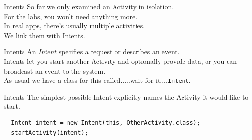 \documentclass[aspectratio=169]{beamer}
\begin{document}
\begin{frame}{Intents}
\Large
So far we only examined an Activity in isolation. \\
\vspace{1em}
For the labs, you won't need anything more. \\
\vspace{1em}
In real apps, there's usually multiple activities. \\
\vspace{1em}
We link them with Intents.
\end{frame}



\begin{frame}{Intents}
\Large
An \emph{Intent} specifies a request or describes an event. \\
\vspace{1em}
Intents let you start another Activity and optionally provide data, or you can broadcast an event to the system. \\
\vspace{1em}
As usual we have a class for this called.....wait for it....\pause\texttt{Intent}.
\end{frame}



\begin{frame}[fragile]{Intents}
\Large
The simplest possible Intent explicitly names the Activity it would like to start. \\
\vspace{1em}
\large
\begin{Verbatim}
  Intent intent = new Intent(this, OtherActivity.class);
  startActivity(intent);
\end{Verbatim}
\end{frame}
\end{document}
